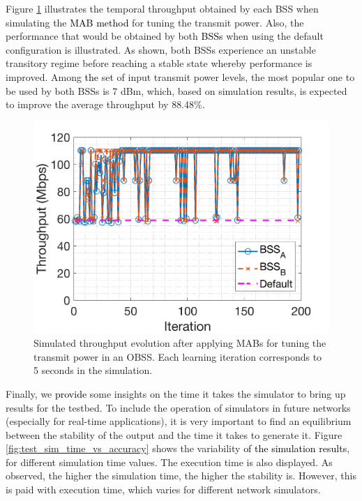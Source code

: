 \documentclass[journal]{IEEEtran}
\begin{document}
	Figure \ref{fig:results_komondor} illustrates the temporal throughput obtained by each BSS when simulating the \textcolor{black}{MAB method} for tuning the transmit power. Also, the performance that would be obtained by both \textcolor{black}{BSSs} when using the default configuration is illustrated. As shown, both BSSs experience an unstable transitory regime before reaching a stable state whereby performance is improved. Among \textcolor{black}{the} set of input transmit power levels, the most popular one to be used by both BSSs is 7 dBm, which, based on simulation results, is expected to improve the average throughput by 88.48\%.
	
	\begin{figure}[ht!]
	\centering
	\includegraphics[width=0.8\columnwidth]{throughput_evolution_komondor.png}
	\caption{Simulated throughput evolution after applying MABs for tuning the transmit power in an OBSS. Each learning iteration corresponds to 5 seconds in the simulation.}
	\label{fig:results_komondor}
	\end{figure}
	
	Finally, we \textcolor{black}{provide} some insights on the time it takes the simulator to bring up results for the testbed. To include the operation of simulators in future networks (especially for real-time applications), it is very important to find an equilibrium between the stability of the output and the time it takes to generate it. Figure \ref{fig:test_sim_time_vs_accuracy} shows the variability \textcolor{black}{of the simulation results}, for different simulation time values. The execution time is also displayed. As observed, the higher the simulation time, the higher the stability is. However, this is paid with execution time, which varies for different network simulators.
	
\end{document}
